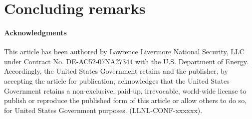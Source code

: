 \section{Concluding remarks}



\paragraph{Acknowledgments}
This article has been authored by Lawrence Livermore National Security, LLC
under Contract No. DE-AC52-07NA27344 with the U.S. Department of
Energy. Accordingly, the United States Government retains and the publisher,
by accepting the article for publication, acknowledges that the United States
Government retains a non-exclusive, paid-up, irrevocable, world-wide license
to publish or reproduce the published form of this article or allow others to
do so, for United States Government purposes. (LLNL-CONF-xxxxxx).
